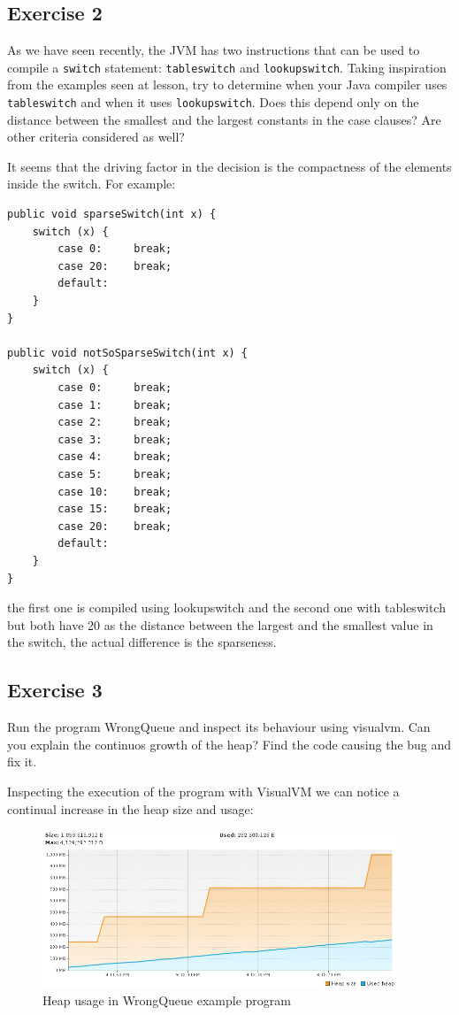 \subsection{Exercise 2}
As we have seen recently, the JVM has two instructions that can be used to compile a \verb|switch| statement: \verb|tableswitch| and \verb|lookupswitch|.
Taking inspiration from the examples seen at lesson, try to determine when your Java compiler uses \verb|tableswitch| and when it uses \verb|lookupswitch|.
Does this depend only on the distance between the smallest and the largest constants in the case clauses? Are other criteria considered as well?

It seems that the driving factor in the decision is the compactness of the elements inside the switch.
For example:
\begin{verbatim}
public void sparseSwitch(int x) {
    switch (x) {
        case 0:     break;
        case 20:    break;
        default:
    }
}

public void notSoSparseSwitch(int x) {
    switch (x) {
        case 0:     break;
        case 1:     break;
        case 2:     break;
        case 3:     break;
        case 4:     break;
        case 5:     break;
        case 10:    break;
        case 15:    break;
        case 20:    break;
        default:
    }
}
\end{verbatim}
the first one is compiled using lookupswitch and the second one with tableswitch but both have 20 as the distance between the largest and the smallest value in the switch, the actual difference is the sparseness.

\subsection{Exercise 3}
Run the program WrongQueue and inspect its behaviour using visualvm.
Can you explain the continuos growth of the heap? Find the code causing the bug and fix it.

Inspecting the execution of the program with VisualVM we can notice a continual increase in the heap size and usage:
\begin{figure}[H]
    \centering
    \includegraphics[width=400px]{images/2_JVM/WrongQueue.png}
    \caption{Heap usage in WrongQueue example program}
\end{figure}

